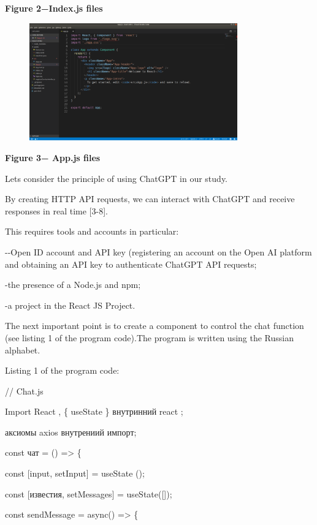 {\bfseries Figure 2−Index.js files}

\begin{figure}[H]
	\centering
	\includegraphics[width=0.8\textwidth]{assets/47}
	\caption*{}
\end{figure}

{\bfseries Figure 3− App.js files}

Let\textquotesingle s consider the principle of using ChatGPT in our
study.

By creating HTTP API requests, we can interact with ChatGPT and receive
responses in real time {[}3-8{]}.

This requires tools and accounts in particular:

-\/-Open ID account and API key (registering an account on the Open AI
platform and obtaining an API key to authenticate ChatGPT API requests;

-the presence of a Node.js and npm;

-a project in the React JS Project.

The next important point is to create a component to control the chat
function (see listing 1 of the program code).The program is written
using the Russian alphabet.

Listing 1 of the program code:

// Chat.js

Import React , \{ useState \} внутринний
\textquotesingle react\textquotesingle{} ;

аксиомы \textquotesingle axios\textquotesingle{} внутрениий импорт;

const чат = () =\textgreater{} \{

const {[}input, setInput{]} = useState
(\textquotesingle\textquotesingle);

const {[}известия, setMessages{]} = useState({[}{]});

const sendMessage = async() =\textgreater{} \{

